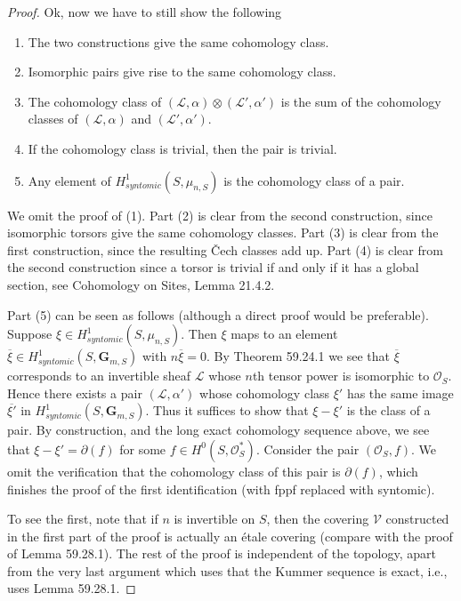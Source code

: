 \begin{proof}
Ok, now we have to still show the following
\begin{enumerate}
\item The two constructions give the same cohomology class.
\item Isomorphic pairs give rise to the same cohomology class.
\item The cohomology class of $(\mathcal L,\alpha)\otimes(\mathcal L',\alpha')$ is the sum of the cohomology classes of $(\mathcal L,\alpha)$ and $(\mathcal L',\alpha')$.
\item If the cohomology class is trivial, then the pair is trivial.
\item Any element of $H^1_{syntomic}(S,\mu_{n,S})$ is the cohomology class of a pair.
\end{enumerate}
We omit the proof of (1). Part (2) is clear from the second construction, since isomorphic torsors give the same cohomology classes. Part (3) is clear from the first construction, since the resulting \v Cech classes add up. Part (4) is clear from the second construction since a torsor is trivial if and only if it has a global section, see Cohomology on Sites, Lemma 21.4.2.

Part (5) can be seen as follows (although a direct proof would be preferable). Suppose $\xi\in H^1_{syntomic}(S,\mu_{n,S})$. Then $\xi$ maps to an element $\overline\xi\in H^1_{syntomic}(S,\mathbf G_{m,S})$ with $n\overline\xi=0$. By Theorem 59.24.1 we see that $\overline\xi$ corresponds to an invertible sheaf $\mathcal L$ whose $n$th tensor power is isomorphic to $\mathcal O_S$. Hence there exists a pair $(\mathcal L,\alpha')$ whose cohomology class $\xi'$ has the same image $\overline{\xi'}$ in $H^1_{syntomic}(S,\mathbf G_{m,S})$. Thus it suffices to show that $\xi-\xi'$ is the class of a pair. By construction, and the long exact cohomology sequence above, we see that $\xi-\xi'=\partial(f)$ for some $f\in H^0(S,\mathcal O_S^*)$. Consider the pair $(\mathcal O_S,f)$. We omit the verification that the cohomology class of this pair is $\partial(f)$, which finishes the proof of the first identification (with fppf replaced with syntomic).

To see the first, note that if $n$ is invertible on $S$, then the covering $\mathcal V$ constructed in the first part of the proof is actually an étale covering (compare with the proof of Lemma 59.28.1). The rest of the proof is independent of the topology, apart from the very last argument which uses that the Kummer sequence is exact, i.e., uses Lemma 59.28.1.
\end{proof}
